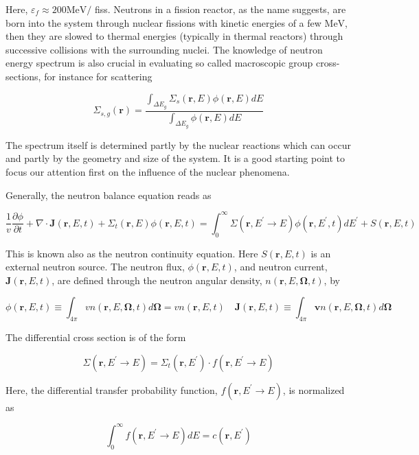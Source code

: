 \documentclass[10pt]{article}
\begin{document}
Here, $\varepsilon_{f} \approx 200 \mathrm{MeV} /$ fiss. Neutrons in a fission reactor, as the name suggests, are born into the system through nuclear fissions with kinetic energies of a few $\mathrm{MeV}$, then they are slowed to thermal energies (typically in thermal reactors) through successive collisions with the surrounding nuclei. The knowledge of neutron energy spectrum is also crucial in evaluating so called macroscopic group cross-sections, for instance for scattering

$$
\Sigma_{s, g}(\mathbf{r})=\frac{\int_{\Delta E_{g}} \Sigma_{s}(\mathbf{r}, E) \phi(\mathbf{r}, E) d E}{\int_{\Delta E_{g}} \phi(\mathbf{r}, E) d E}
$$

The spectrum itself is determined partly by the nuclear reactions which can occur and partly by the geometry and size of the system. It is a good starting point to focus our attention first on the influence of the nuclear phenomena.

Generally, the neutron balance equation reads as

$$
\frac{1}{v} \frac{\partial \phi}{\partial t}+\nabla \cdot \mathbf{J}(\mathbf{r}, E, t)+\Sigma_{t}(\mathbf{r}, E) \phi(\mathbf{r}, E, t)=\int_{0}^{\infty} \Sigma\left(\mathbf{r}, E^{\prime} \rightarrow E\right) \phi\left(\mathbf{r}, E^{\prime}, t\right) d E^{\prime}+S(\mathbf{r}, E, t)
$$

This is known also as the neutron continuity equation. Here $S(\mathbf{r}, E, t)$ is an external neutron source. The neutron flux, $\phi(\mathbf{r}, E, t)$, and neutron current, $\mathbf{J}(\mathbf{r}, E, t)$, are defined through the neutron angular density, $n(\mathbf{r}, E, \boldsymbol{\Omega}, t)$, by

$$
\phi(\mathbf{r}, E, t) \equiv \int_{4 \pi} v n(\mathbf{r}, E, \boldsymbol{\Omega}, t) d \boldsymbol{\Omega}=v n(\mathbf{r}, E, t) \quad \mathbf{J}(\mathbf{r}, E, t) \equiv \int_{4 \pi} \mathbf{v} n(\mathbf{r}, E, \mathbf{\Omega}, t) d \mathbf{\Omega}
$$

The differential cross section is of the form

$$
\Sigma\left(\mathbf{r}, E^{\prime} \rightarrow E\right)=\Sigma_{t}\left(\mathbf{r}, E^{\prime}\right) \cdot f\left(\mathbf{r}, E^{\prime} \rightarrow E\right)
$$

Here, the differential transfer probability function, $f\left(\mathbf{r}, E^{\prime} \rightarrow E\right)$, is normalized as

$$
\int_{0}^{\infty} f\left(\mathbf{r}, E^{\prime} \rightarrow E\right) d E=c\left(\mathbf{r}, E^{\prime}\right)
$$
\end{document}
